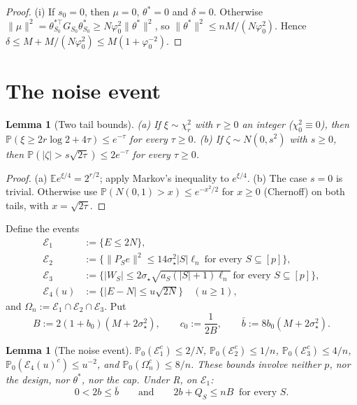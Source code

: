 \documentclass[11pt]{article}
\newtheorem{lemma}[theorem]{Lemma}
\theoremstyle{remark}
\newcommand{\E}{\mathbb E}
\renewcommand{\P}{\mathbb P}
\newcommand{\sst}{\sigma_\star}
\begin{document}
\begin{proof}
(i) If $s_0=0$, then $\mu=0$, $\theta^\ast=0$ and $\delta=0$. Otherwise $\|\mu\|^2=\theta^{\ast\top}_{S_0}G_{S_0}\theta^\ast_{S_0}\ge N\varphi_0^2\|\theta^\ast\|^2$, so $\|\theta^\ast\|^2\le nM/(N\varphi_0^2)$. Hence $\delta\le M+M/(N\varphi_0^2)\le M(1+\varphi_0^{-2})$.
\end{proof}

\section{The noise event}\label{sec:noise}

\begin{lemma}[Two tail bounds]\label{lem:tails}
(a) If $\xi\sim\chi^2_r$ with $r\ge0$ an integer ($\chi^2_0\equiv0$), then $\P(\xi\ge2r\log2+4\tau)\le e^{-\tau}$ for every $\tau\ge0$. (b) If $\zeta\sim N(0,s^2)$ with $s\ge0$, then $\P(|\zeta|>s\sqrt{2\tau})\le2e^{-\tau}$ for every $\tau\ge0$.
\end{lemma}

\begin{proof}
(a) $\E e^{\xi/4}=2^{r/2}$; apply Markov's inequality to $e^{\xi/4}$. (b) The case $s=0$ is trivial. Otherwise use $\P(N(0,1)>x)\le e^{-x^2/2}$ for $x\ge0$ (Chernoff) on both tails, with $x=\sqrt{2\tau}$.
\end{proof}

Define the events
\begin{align*}
\mathcal E_1&:=\{E\le2N\},\\
\mathcal E_2&:=\{\|P_Se\|^2\le14\sst^2|S|\ell_n\ \text{for every }S\subseteq[p]\},\\
\mathcal E_3&:=\{|W_S|\le2\sst\sqrt{a_S(|S|+1)\ell_n}\ \text{for every }S\subseteq[p]\},\\
\mathcal E_4(u)&:=\{|E-N|\le u\sqrt{2N}\}\quad(u\ge1),
\end{align*}
and $\Omega_n:=\mathcal E_1\cap\mathcal E_2\cap\mathcal E_3$. Put
\[
B:=2(1+b_0)(M+2\sst^2),\qquad c_0:=\frac1{2B},\qquad \bar b:=8b_0(M+2\sst^2).
\]

\begin{lemma}[The noise event]\label{lem:noise}
$\P_0(\mathcal E_1^c)\le2/N$, $\P_0(\mathcal E_2^c)\le1/n$, $\P_0(\mathcal E_3^c)\le4/n$, $\P_0(\mathcal E_4(u)^c)\le u^{-2}$, and $\P_0(\Omega_n^c)\le8/n$. These bounds involve neither $p$, nor the design, nor $\theta^\ast$, nor the cap. Under R, on $\mathcal E_1$:
\begin{equation}\label{eq:B}
0<2b\le\bar b\qquad\text{and}\qquad 2b+Q_S\le nB\ \text{ for every }S .
\end{equation}
\end{lemma}
\end{document}
